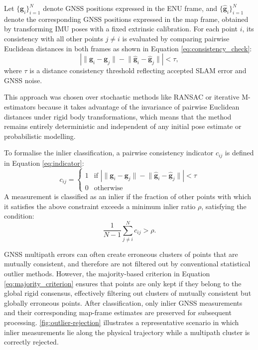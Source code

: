 Let $\{\mathbf{g}_i\}_{i=1}^{N}$ denote GNSS positions expressed in the ENU frame, and $\{\hat{\mathbf{g}}_i\}_{i=1}^{N}$ denote the corresponding GNSS positions expressed in the map frame, obtained by transforming IMU poses with a fixed extrinsic calibration. For each point $i$, its consistency with all other points $j \neq i$ is evaluated by comparing pairwise Euclidean distances in both frames as shown in Equation \eqref{eq:consistency_check}:
\begin{equation}
\label{eq:consistency_check}
\left| \lVert \mathbf{g}_i - \mathbf{g}_j \rVert - \lVert \hat{\mathbf{g}}_i - \hat{\mathbf{g}}_j \rVert \right| < \tau,
\end{equation}
where $\tau$ is a distance consistency threshold reflecting accepted SLAM error and GNSS noise.

This approach was chosen over stochastic methods like RANSAC \cite{fischlerRandomSampleConsensus1981} or iterative M-estimators because it takes advantage of the invariance of pairwise Euclidean distances under rigid body transformations, which means that the method remains entirely deterministic and independent of any initial pose estimate or probabilistic modelling.

To formalise the inlier classification, a pairwise consistency indicator $c_{ij}$ is defined in Equation \eqref{eq:indicator}:
\begin{equation}
\label{eq:indicator}
c_{ij} = 
\begin{cases} 
1 & \text{if } \left| \lVert \mathbf{g}_i - \mathbf{g}_j \rVert - \lVert \hat{\mathbf{g}}_i - \hat{\mathbf{g}}_j \rVert \right| < \tau \\
0 & \text{otherwise}
\end{cases}
\end{equation}
A measurement is classified as an inlier if the fraction of other points with which it satisfies the above constraint exceeds a minimum inlier ratio $\rho$, satisfying the condition:
\begin{equation}
\label{eq:majority_criterion}
\frac{1}{N-1} \sum_{j \neq i}^{N} c_{ij} > \rho.
\end{equation}

GNSS multipath errors \cite{wenExclusionGNSSNLOS2018} can often create erroneous clusters of points that are mutually consistent, and therefore are not filtered out by conventional statistical outlier methods. However, the majority-based criterion in Equation \eqref{eq:majority_criterion} ensures that points are only kept if they belong to the global rigid consensus, effectively filtering out clusters of mutually consistent but globally erroneous points. After classification, only inlier GNSS measurements and their corresponding map-frame estimates are preserved for subsequent processing. \cref{fig:outlier-rejection} illustrates a representative scenario in which inlier measurements lie along the physical trajectory while a multipath cluster is correctly rejected.


